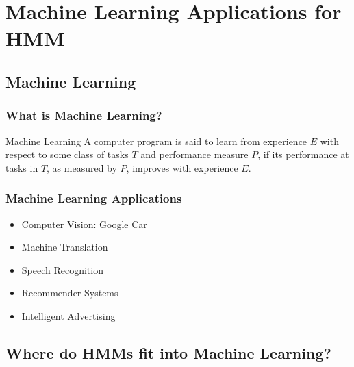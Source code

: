 \section{Machine Learning Applications for HMM}
\label{sec:ml}

\subsection{Machine Learning}
\label{sec:hmm_in_ml}

\begin{frame}
  \frametitle{What is Machine Learning?}
  \begin{block}{Machine Learning}
    A computer program is said to learn from experience $E$ with
    respect to some class of tasks $T$ and performance measure $P$, if
    its performance at tasks in $T$, as measured by $P$, improves with
    experience $E$.
  \end{block}
\end{frame}

\begin{frame}
  \frametitle{Machine Learning Applications}
  \begin{itemize}
  \item Computer Vision: Google Car
  \item Machine Translation
  \item Speech Recognition
  \item Recommender Systems
  \item Intelligent Advertising
  \end{itemize}
\end{frame}

\subsection{Where do HMMs fit into Machine Learning?}
\label{sec:apps}

